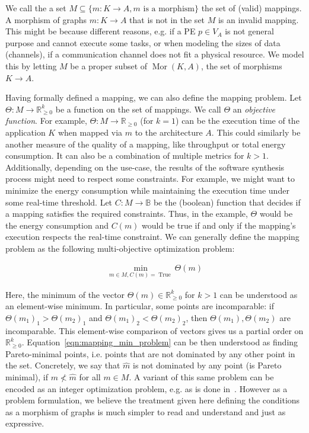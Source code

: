 We call the a set $M \subseteq \{m : K \rightarrow A, m \text{ is a morphism} \}$ the set of (valid) mappings. A morphism of graphs $m : K \rightarrow A$ that is not in the set $M$ is an invalid mapping.
This might be because different reasons, e.g. if a \ac{PE} $p \in V_A$ is not general purpose and cannot execute some tasks, or when modeling the sizes of data (channels), if a communication channel does not fit a physical resource.
We model this by letting $M$ be a proper subset of $\operatorname{Mor}(K,A)$, the set of morphisms $K \rightarrow A$.

Having formally defined a mapping, we can also define the mapping problem. Let $\Theta : M \rightarrow \mathbb{R}_{\geq 0}^k$  be a function on the set of mappings. We call $\Theta$ an \emph{objective function}.
For example, $\Theta: M \rightarrow \mathbb{R}_{\geq 0}$ (for $k = 1$) can be the execution time of the application $K$ when mapped via $m$ to the architecture $A$.
This could similarly be another measure of the quality of a mapping, like throughput or total energy consumption. It can also be a combination of multiple metrics for $k > 1$.
Additionally, depending on the use-case, the results of the software synthesis process might need to respect some constraints.
For example, we might want to minimize the energy consumption while maintaining the execution time under some real-time threshold.
Let $C : M \rightarrow \mathbb{B}$ be the (boolean) function that decides if a mapping satisfies the required constraints.
Thus, in the example, $\Theta$ would be the energy consumption and $C(m)$ would be true if and only if the mapping's execution respects the real-time constraint.
We can generally define the mapping problem as the following multi-objective optimization problem:

\begin{align}
  \label{eqn:mapping_min_problem}
  \min_{m \in M, C(m) = \operatorname{True}} \Theta(m)
\end{align}

Here, the minimum of the vector $\Theta(m) \in \mathbb{R}_{\geq 0}^k$ for $k > 1$ can be understood as an element-wise minimum. In particular, some points are incomparable: if $\Theta(m_1)_1 > \Theta(m_2)_1$ and $\Theta(m_1)_2 < \Theta(m_2)_2$, then $\Theta(m_1), \Theta(m_2)$ are incomparable.
This element-wise comparison of vectors gives us a partial order on $\mathbb{R}_{\geq 0}^k$.
Equation~\ref{eqn:mapping_min_problem} can be then understood as finding Pareto-minimal points, i.e. points that are not dominated by any other point in the set.
Concretely, we say that $\hat m$ is not dominated by any point (is Pareto minimal), if $m \nless \hat m$ for all $m \in M$. 
A variant of this same problem can be encoded as an integer optimization problem, e.g. as is done in~\cite{erbas2006multiobjective}.
However as a problem formulation, we believe the treatment given here defining the conditions as a morphism of graphs is much simpler to read and understand and just as expressive.

